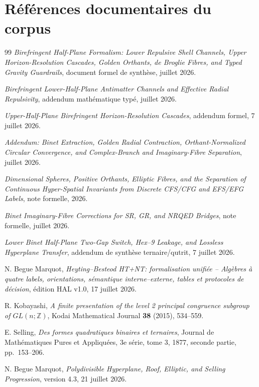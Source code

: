 \documentclass[11pt,a4paper]{article}
\begin{document}
\section{Références documentaires du corpus}
\begin{thebibliography}{99}
\emph{Birefringent Half-Plane Formalism: Lower Repulsive Shell Channels, Upper Horizon-Resolution Cascades, Golden Orthants, de Broglie Fibres, and Typed Gravity Guardrails}, document formel de synthèse, juillet 2026.

\emph{Birefringent Lower-Half-Plane Antimatter Channels and Effective Radial Repulsivity}, addendum mathématique typé, juillet 2026.

\emph{Upper-Half-Plane Birefringent Horizon-Resolution Cascades}, addendum formel, 7 juillet 2026.

\emph{Addendum: Binet Extraction, Golden Radial Contraction, Orthant-Normalized Circular Convergence, and Complex-Branch and Imaginary-Fibre Separation}, juillet 2026.

\emph{Dimensional Spheres, Positive Orthants, Elliptic Fibres, and the Separation of Continuous Hyper-Spatial Invariants from Discrete CFS/CFG and EFS/EFG Labels}, note formelle, 2026.

\emph{Binet Imaginary-Fibre Corrections for SR, GR, and NRQED Bridges}, note formelle, juillet 2026.

\emph{Lower Binet Half-Plane Two-Gap Switch, Hex--9 Leakage, and Lossless Hyperplane Transfer}, addendum de synthèse ternaire/qutrit, 7 juillet 2026.

N. Begue Marquot, \emph{Heyting--Besteod HT+NT: formalisation unifiée -- Algèbres à quatre labels, orientations, sémantique interne--externe, tables et protocoles de décision}, édition HAL v1.0, 17 juillet 2026.

R. Kobayashi, \emph{A finite presentation of the level 2 principal congruence subgroup of $GL(n;\mathbb Z)$},
Kodai Mathematical Journal \textbf{38} (2015), 534--559.

E. Selling, \emph{Des formes quadratiques binaires et ternaires}, Journal de Mathématiques Pures et Appliquées, 3e série, tome 3, 1877, seconde partie, pp.~153--206.

N. Begue Marquot, \emph{Polydivisible Hyperplane, Roof, Elliptic, and Selling Progression}, version 4.3, 21 juillet 2026.


\end{thebibliography}
\end{document}
